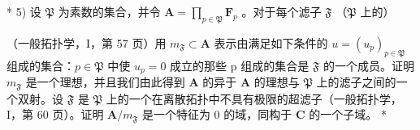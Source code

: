 * 5) 设 \(\mathfrak{P}\) 为素数的集合，并令 \(\mathbf{A} = \prod_{p\in \mathfrak{P}}\mathbf{F}_p\) 。对于每个滤子 \(\mathfrak{F}\) （\(\mathfrak{P}\) 上的）

（一般拓扑学，I，第 57 页）用 \(m_{\mathfrak{F}} \subset \mathbf{A}\) 表示由满足如下条件的 \(u = (u_p)_{p \in \mathfrak{P}}\) 组成的集合：\(p \in \mathfrak{P}\) 中使 \(u_p = 0\) 成立的那些 p 组成的集合是 \(\mathfrak{F}\) 的一个成员。证明 \(m_{\mathfrak{F}}\) 是一个理想，并且我们由此得到 \(\mathbf{A}\) 的异于 \(\mathbf{A}\) 的理想与 \(\mathfrak{P}\) 上的滤子之间的一个双射。设 \(\mathfrak{F}\) 是 \(\mathfrak{P}\) 上的一个在离散拓扑中不具有极限的超滤子（一般拓扑学，I，第 60 页）。证明 \(\mathbf{A}/m_{\mathfrak{F}}\) 是一个特征为 0 的域，同构于 \(\mathbf{C}\) 的一个子域。 *

